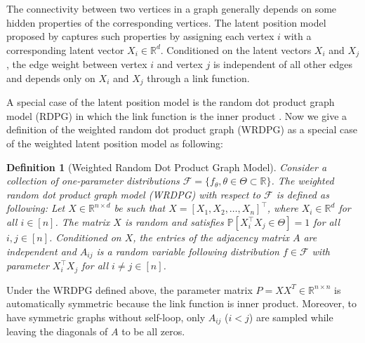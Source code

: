 \documentclass[a4paper]{article}
\newtheorem{definition}[fact]{Definition}
\begin{document}
The connectivity between two vertices in a graph generally depends on some hidden properties of the corresponding vertices. The latent position model proposed by \citet{hoff2002latent} captures such properties by assigning each vertex $i$ with a corresponding latent vector $X_i \in \mathbb{R}^d$. Conditioned on the latent vectors $X_i$ and $X_j$, the edge weight between vertex $i$ and vertex $j$ is independent of all other edges and depends only on $X_i$ and $X_j$ through a link function.

A special case of the latent position model is the random dot product graph model (RDPG) in which the link function is the inner product \citep{young2007random, nickel2007random}. Now we give a definition of the weighted random dot product graph (WRDPG) as a special case of the weighted latent position model as following:
\begin{definition}[Weighted Random Dot Product Graph Model]
Consider a collection of one-parameter distributions $\mathcal{F} = \{ f_{\theta}, \theta \in \Theta \subset \mathbb{R} \}$. The weighted random dot product graph model (WRDPG) with respect to $\mathcal{F}$ is defined as following: Let $X \in \mathbb{R}^{n \times d}$ be such that $X = [X_1, X_2, \dotsc, X_n]^{\top}$, where $X_i \in \mathbb{R}^d$ for all $i \in [n]$. The matrix $X$ is random and satisfies $\mathbb{P}\left[ X_i^{\top} X_j \in \Theta \right] = 1$ for all $i, j \in [n]$. Conditioned on $X$, the entries of the adjacency matrix $A$ are independent and $A_{ij}$ is a random variable following distribution $f \in \mathcal{F}$ with parameter $ X_i^{\top} X_j $ for all $i \ne j \in [n]$.
\end{definition}
Under the WRDPG defined above, the parameter matrix $P = X X^T \in \mathbb{R}^{n \times n}$ is automatically symmetric because the link function is inner product. Moreover, to have symmetric graphs without self-loop, only $A_{ij}$ ($i < j$) are sampled while leaving the diagonals of $A$ to be all zeros.

\end{document}
